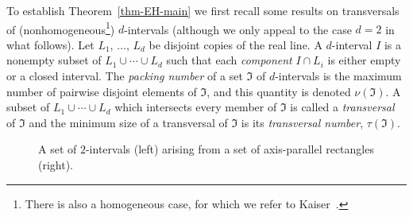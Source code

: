 \documentclass[
final
, nomarks
]{dmtcs-episciences}
\begin{document}
To establish Theorem~\ref{thm-EH-main} we first recall some results on transversals of (nonhomogeneous\footnote{There is also a homogeneous case, for which we refer to Kaiser~\cite{kaiser:transversals-of:}.}) $d$-intervals (although we only appeal to the case $d=2$ in what follows). Let $L_1$, $\dots$, $L_d$ be disjoint copies of the real line. A $d$-interval $I$ is a nonempty subset of $L_1\cup\cdots\cup L_d$ such that each \emph{component} $I\cap L_i$ is either empty or a closed interval. The \emph{packing number} of a set $\mathfrak{I}$ of $d$-intervals is the maximum number of pairwise disjoint elements of $\mathfrak{I}$, and this quantity is denoted $\nu(\mathfrak{I})$. A subset of $L_1\cup\cdots \cup L_d$ which intersects every member of $\mathfrak{I}$ is called a \emph{transversal} of $\mathfrak{I}$ and the minimum size of a transversal of $\mathfrak{I}$ is its \emph{transversal number}, $\tau(\mathfrak{I})$.

\begin{figure}
\begin{footnotesize}
\begin{center}
\quad\quad\quad\quad
\end{center}
\caption{A set of $2$-intervals (left) arising from a set of axis-parallel rectangles (right).}
\label{fig-2-interval}
\end{footnotesize}
\end{figure}
\end{document}
